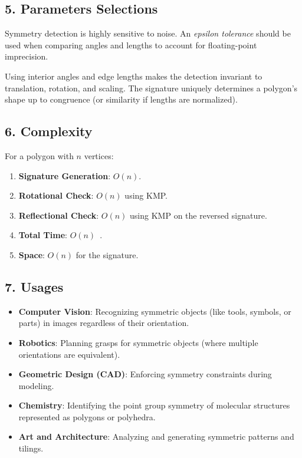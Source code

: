 \subsection{5. Parameters Selections}
\begin{definition}
\label{def:ps_precision}
Symmetry detection is highly sensitive to noise. An \emph{epsilon tolerance} should be used when comparing angles and lengths to account for floating-point imprecision.
\end{definition}

\begin{definition}
\label{def:ps_signature}
Using interior angles and edge lengths makes the detection invariant to translation, rotation, and scaling. The signature uniquely determines a polygon's shape up to congruence (or similarity if lengths are normalized).
\end{definition}

\subsection{6. Complexity}
\begin{theorem}
\label{thm:ps_complexity_summary}
For a polygon with $n$ vertices:
\begin{enumerate}
    \item \textbf{Signature Generation}: $O(n)$.
    \item \textbf{Rotational Check}: $O(n)$ using KMP.
    \item \textbf{Reflectional Check}: $O(n)$ using KMP on the reversed signature.
    \item \textbf{Total Time}: $O(n)$~\cite{atallah1985symmetry}.
    \item \textbf{Space}: $O(n)$ for the signature.
\end{enumerate}
\end{theorem}

\subsection{7. Usages}
\begin{itemize}
    \item \textbf{Computer Vision}: Recognizing symmetric objects (like tools, symbols, or parts) in images regardless of their orientation.
    \item \textbf{Robotics}: Planning grasps for symmetric objects (where multiple orientations are equivalent).
    \item \textbf{Geometric Design (CAD)}: Enforcing symmetry constraints during modeling.
    \item \textbf{Chemistry}: Identifying the point group symmetry of molecular structures represented as polygons or polyhedra.
    \item \textbf{Art and Architecture}: Analyzing and generating symmetric patterns and tilings.
\end{itemize}

